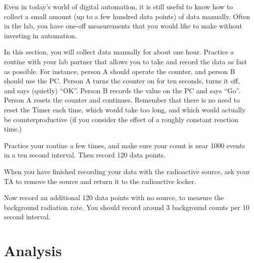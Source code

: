 Even in today's world of digital automation, it is still useful to
know how to collect a small amount (up to a few hundred data points)
of data manually.  Often in the lab, you have one-off measurements
that you would like to make without investing in automation.

In this section, you will collect data manually for about one hour.
Practice a routine with your lab partner that allows you to take and
record the data as fast as possible.  For instance, person A should
operate the counter, and person B should use the PC.  Person A turns
the counter on for ten seconds, turns it off, and says (quietly)
``OK''.  Person B records the value on the PC and says ``Go''.  Person
A resets the counter and continues.  Remember that there is no need to
reset the Timer each time, which would take too long, and which would
actually be counterproductive (if you consider the effect of a roughly
constant reaction time.) 

Practice your routine a few times, and make sure your count is near
1000 events in a ten second interval.  Then record 120 data points.

When you have finished recording your data with the radioactive
source, ask your TA to remove the source and return it to the
radioactive locker.

Now record an additional 120 data points with no source, to measure
the background radiation rate.  You should record around 3 background
counts per 10 second interval.

\section{Analysis}

